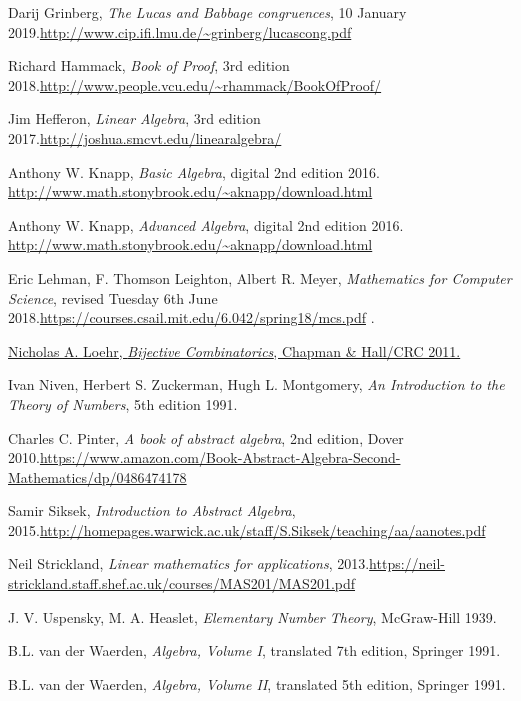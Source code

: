 \documentclass[numbers=enddot,12pt,final,onecolumn,notitlepage]{scrartcl}%
\numberwithin{exer}{subsection}
\theoremstyle{definition}
\begin{document}
\begin{thebibliography}{999999999}
Darij Grinberg, \textit{The Lucas and Babbage
congruences}, 10 January 2019.\newline\url{http://www.cip.ifi.lmu.de/~grinberg/lucascong.pdf}

Richard Hammack, \textit{Book of Proof}, 3rd
edition 2018.\newline\url{http://www.people.vcu.edu/~rhammack/BookOfProof/}

Jim Hefferon, \textit{Linear Algebra}, 3rd edition
2017.\newline\url{http://joshua.smcvt.edu/linearalgebra/}

Anthony W. Knapp, \textit{Basic Algebra}, digital
2nd edition 2016. \newline\url{http://www.math.stonybrook.edu/~aknapp/download.html}

Anthony W. Knapp, \textit{Advanced Algebra}, digital
2nd edition 2016. \newline\url{http://www.math.stonybrook.edu/~aknapp/download.html}

Eric Lehman, F. Thomson Leighton, Albert R. Meyer,
\textit{Mathematics for Computer Science}, revised Tuesday 6th June
2018.\newline\url{https://courses.csail.mit.edu/6.042/spring18/mcs.pdf} .

%
\href{http://www.math.vt.edu/people/nloehr/bijbook.html}{Nicholas A. Loehr,
\textit{Bijective Combinatorics}, Chapman \& Hall/CRC 2011.}

Ivan Niven, Herbert S. Zuckerman, Hugh L.
Montgomery, \textit{An Introduction to the Theory of Numbers}, 5th edition 1991.

Charles C. Pinter, \textit{A book of abstract
algebra}, 2nd edition, Dover 2010.\newline\url{https://www.amazon.com/Book-Abstract-Algebra-Second-Mathematics/dp/0486474178}

Samir Siksek, \textit{Introduction to Abstract
Algebra}, 2015.\newline\url{http://homepages.warwick.ac.uk/staff/S.Siksek/teaching/aa/aanotes.pdf}

Neil Strickland, \textit{Linear mathematics for
applications}, 2013.\newline\url{https://neil-strickland.staff.shef.ac.uk/courses/MAS201/MAS201.pdf}

J. V. Uspensky, M. A. Heaslet,
\textit{Elementary Number Theory}, McGraw-Hill 1939.

B.L. van der Waerden, \textit{Algebra, Volume I},
translated 7th edition, Springer 1991.

B.L. van der Waerden, \textit{Algebra, Volume
II}, translated 5th edition, Springer 1991.
\end{thebibliography}
\end{document}
